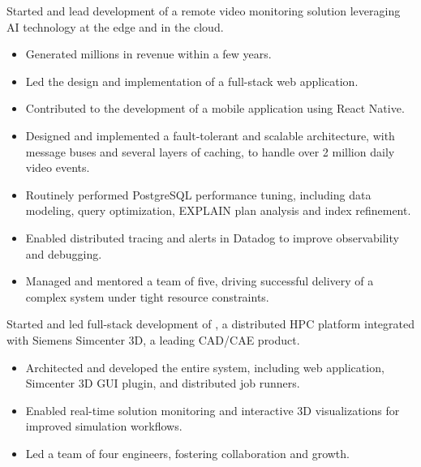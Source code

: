 \documentclass{mycv}
\begin{document}
\begin{sectionindent}

    Started and lead development of a remote video monitoring solution leveraging AI technology at the edge and in the cloud.

    \begin{itemize}
        \item Generated millions in revenue within a few years.
        \item Led the design and implementation of a full-stack web application.
        \item Contributed to the development of a mobile application using React Native.
        \item Designed and implemented a fault-tolerant and scalable architecture, with message buses and several layers of caching, to handle over 2 million daily video events.
        \item Routinely performed PostgreSQL performance tuning, including data modeling, query optimization, EXPLAIN plan analysis and index refinement.
        \item Enabled distributed tracing and alerts in Datadog to improve observability and debugging.
        \item Managed and mentored a team of five, driving successful delivery of a complex system under tight resource constraints.
    \end{itemize}


    \vspace{2\parskip}


    Started and led full-stack development of \href{https://blogs.sw.siemens.com/simcenter/simcenter-3d-2022-1-remote-solve/}{}, a distributed HPC platform integrated with Siemens Simcenter 3D, a leading CAD/CAE product.

    \begin{itemize}
        \item Architected and developed the entire system, including web application, Simcenter 3D GUI plugin, and distributed job runners.
        \item Enabled real-time solution monitoring and interactive 3D visualizations for improved simulation workflows.
        \item Led a team of four engineers, fostering collaboration and growth.
    \end{itemize}


\end{sectionindent}
\end{document}
